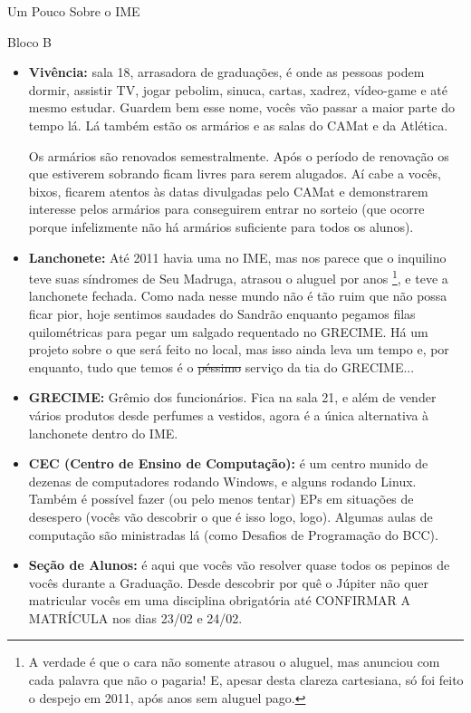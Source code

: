 \begin{secao}{Um Pouco Sobre o IME}
\begin{subsecao}{Bloco B}
\begin{itemize}
\item {\bf Vivência:} sala 18, arrasadora de graduações, é onde as pessoas podem
dormir, assistir TV, jogar pebolim, sinuca, cartas, xadrez, vídeo-game e até
mesmo estudar. Guardem bem esse nome, vocês vão passar a maior parte do tempo lá.
Lá também estão os armários e as salas do CAMat e da Atlética.

Os armários são renovados semestralmente. Após o período de renovação os que
estiverem sobrando ficam livres para serem alugados. Aí cabe a vocês, bixos, ficarem
atentos às datas divulgadas pelo CAMat e demonstrarem interesse pelos armários para
conseguirem entrar no sorteio (que ocorre porque infelizmente não há armários
suficiente para todos os alunos).

\item {\bf Lanchonete:} Até 2011 havia uma no IME, mas nos parece que o inquilino
teve suas síndromes de Seu Madruga, atrasou o aluguel por anos \footnote{A verdade
é que o cara não somente atrasou o aluguel, mas anunciou com cada palavra que não
o pagaria! E, apesar desta clareza cartesiana, só foi feito o despejo em 2011,
após anos sem aluguel pago.}, e teve a lanchonete fechada. Como nada nesse
mundo não é tão ruim que não possa ficar pior, hoje sentimos saudades do Sandrão
enquanto pegamos filas quilométricas para pegar um salgado requentado no GRECIME.
Há um projeto sobre o que será feito no local, mas isso ainda leva um tempo e,
por enquanto, tudo que temos é o \sout{péssimo} serviço da tia do GRECIME...

\item {\bf GRECIME:} Grêmio dos funcionários. Fica na sala 21, e além de vender
vários produtos desde perfumes a vestidos, agora é a única alternativa à
lanchonete dentro do IME.

\item {\bf CEC (Centro de Ensino de Computação):} é um centro munido de dezenas
de computadores rodando Windows, e alguns rodando Linux. Também é possível fazer
(ou pelo menos tentar) EPs em situações de desespero (vocês vão descobrir o que é
isso logo, logo). Algumas aulas de computação são ministradas lá (como Desafios
de Programação do BCC).

\item {\bf Seção de Alunos:} é aqui que vocês vão resolver quase todos os pepinos
de vocês durante a Graduação. Desde descobrir por quê o Júpiter não quer matricular vocês
em uma disciplina obrigatória até CONFIRMAR A MATRÍCULA nos dias 23/02 e 24/02. %


\end{itemize}
\end{subsecao}
\end{secao}
